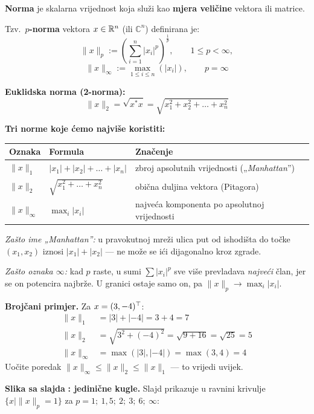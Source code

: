 \begin{definicija}[Norma]
\textbf{Norma} je skalarna vrijednost koja služi kao \textbf{mjera veličine}
vektora ili matrice.

Tzv.\ \textbf{$p$-norma} vektora $x \in \mathbb{R}^n$ (ili $\mathbb{C}^n$) definirana
je:
\[
\|x\|_p := \left(\sum_{i=1}^{n}|x_i|^p\right)^{\frac{1}{p}},
\qquad 1 \le p < \infty,
\]
\[
\|x\|_\infty := \max_{1\le i\le n}\left(|x_i|\right), \qquad p = \infty
\]

\textbf{Euklidska norma (2-norma):}
\[
\|x\|_2 = \sqrt{x^{*}x} = \sqrt{x_1^2 + x_2^2 + \dots + x_n^2}
\]
\end{definicija}

\textbf{Tri norme koje ćemo najviše koristiti:}

\begin{center}
\begin{tabular}{lll}
\toprule
\textbf{Oznaka} & \textbf{Formula} & \textbf{Značenje} \\
\midrule
$\|x\|_1$ & $|x_1| + |x_2| + \dots + |x_n|$
  & zbroj apsolutnih vrijednosti („\emph{Manhattan}”) \\
$\|x\|_2$ & $\sqrt{x_1^2 + \dots + x_n^2}$
  & obična duljina vektora (Pitagora) \\
$\|x\|_\infty$ & $\max_i |x_i|$
  & najveća komponenta po apsolutnoj vrijednosti \\
\bottomrule
\end{tabular}
\end{center}

\emph{Zašto ime „Manhattan”:} u pravokutnoj mreži ulica put od ishodišta do
točke $(x_1,x_2)$ iznosi $|x_1|+|x_2|$ --- ne može se ići dijagonalno kroz
zgrade.

\emph{Zašto oznaka $\infty$:} kad $p$ raste, u sumi $\sum|x_i|^p$ sve više
prevladava \emph{najveći} član, jer se on potencira najbrže. U granici ostaje
samo on, pa $\|x\|_p \to \max_i|x_i|$.

\textbf{Brojčani primjer.} Za $x = (3, -4)^{\top}$:
\begin{align}
\|x\|_1 &= |3| + |-4| = 3 + 4 = 7 \\
\|x\|_2 &= \sqrt{3^2 + (-4)^2} = \sqrt{9 + 16} = \sqrt{25} = 5 \\
\|x\|_\infty &= \max(|3|, |-4|) = \max(3,4) = 4
\end{align}
Uočite poredak $\|x\|_\infty \le \|x\|_2 \le \|x\|_1$ --- to vrijedi uvijek.

\textbf{Slika sa slajda} \textbf{: jedinične kugle.} Slajd prikazuje
u ravnini krivulje $\{x \mid \|x\|_p = 1\}$ za
$p = 1;\ 1{,}5;\ 2;\ 3;\ 6;\ \infty$:

